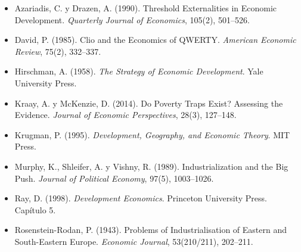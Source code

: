 \documentclass[12pt,letterpaper]{article}
\begin{document}
{\small
\begin{itemize}[leftmargin=*, itemsep=0.25em]
  \item Azariadis, C. y Drazen, A. (1990). Threshold Externalities in Economic Development. \emph{Quarterly Journal of Economics}, 105(2), 501--526.
  \item David, P. (1985). Clio and the Economics of QWERTY. \emph{American Economic Review}, 75(2), 332--337.
  \item Hirschman, A. (1958). \emph{The Strategy of Economic Development}. Yale University Press.
  \item Kraay, A. y McKenzie, D. (2014). Do Poverty Traps Exist? Assessing the Evidence. \emph{Journal of Economic Perspectives}, 28(3), 127--148.
  \item Krugman, P. (1995). \emph{Development, Geography, and Economic Theory}. MIT Press.
  \item Murphy, K., Shleifer, A. y Vishny, R. (1989). Industrialization and the Big Push. \emph{Journal of Political Economy}, 97(5), 1003--1026.
  \item Ray, D. (1998). \emph{Development Economics}. Princeton University Press. Capítulo 5.
  \item Rosenstein-Rodan, P. (1943). Problems of Industrialisation of Eastern and South-Eastern Europe. \emph{Economic Journal}, 53(210/211), 202--211.
\end{itemize}
}
\end{document}

